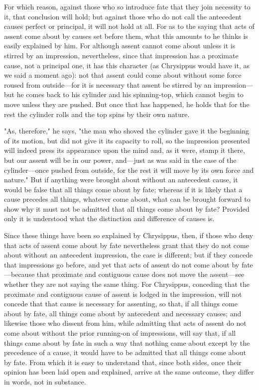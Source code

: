  For which reason, against those who so introduce fate that they join necessity to it, that conclusion will hold; but against those who do not call the antecedent causes perfect or principal, it will not hold at all. For as to the saying that acts of assent come about by causes set before them, what this amounts to he thinks is easily explained by him. For although assent cannot come about unless it is stirred by an impression, nevertheless, since that impression has a proximate cause, not a principal one, it has this character (as Chrysippus would have it, as we said a moment ago): not that assent could come about without some force roused from outside—for it is necessary that assent be stirred by an impression—but he comes back to his cylinder and his spinning-top, which cannot begin to move unless they are pushed. But once that has happened, he holds that for the rest the cylinder rolls and the top spins by their own nature.

 "As, therefore," he says, "the man who shoved the cylinder gave it the beginning of its motion, but did not give it its capacity to roll, so the impression presented will indeed press its appearance upon the mind and, as it were, stamp it there, but our assent will be in our power, and—just as was said in the case of the cylinder—once pushed from outside, for the rest it will move by its own force and nature." But if anything were brought about without an antecedent cause, it would be false that all things come about by fate; whereas if it is likely that a cause precedes all things, whatever come about, what can be brought forward to show why it must not be admitted that all things come about by fate? Provided only it is understood what the distinction and difference of causes is.

 Since these things have been so explained by Chrysippus, then, if those who deny that acts of assent come about by fate nevertheless grant that they do not come about without an antecedent impression, the case is different; but if they concede that impressions go before, and yet that acts of assent do not come about by fate—because that proximate and contiguous cause does not move the assent—see whether they are not saying the same thing. For Chrysippus, conceding that the proximate and contiguous cause of assent is lodged in the impression, will not concede that that cause is necessary for assenting, so that, if all things come about by fate, all things come about by antecedent and necessary causes; and likewise those who dissent from him, while admitting that acts of assent do not come about without the prior running-on of impressions, will say that, if all things came about by fate in such a way that nothing came about except by the precedence of a cause, it would have to be admitted that all things come about by fate. From which it is easy to understand that, since both sides, once their opinion has been laid open and explained, arrive at the same outcome, they differ in words, not in substance.

